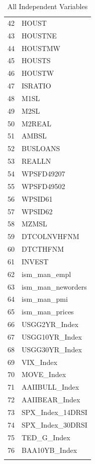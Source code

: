 \begin{longtable}{rl}
  42 & HOUST \\ 
  43 & HOUSTNE \\ 
  44 & HOUSTMW \\ 
  45 & HOUSTS \\ 
  46 & HOUSTW \\ 
  47 & ISRATIO \\ 
  48 & M1SL \\ 
  49 & M2SL \\ 
  50 & M2REAL \\ 
  51 & AMBSL \\ 
  52 & BUSLOANS \\ 
  53 & REALLN \\ 
  54 & WPSFD49207 \\ 
  55 & WPSFD49502 \\ 
  56 & WPSID61 \\ 
  57 & WPSID62 \\ 
  58 & MZMSL \\ 
  59 & DTCOLNVHFNM \\ 
  60 & DTCTHFNM \\ 
  61 & INVEST \\ 
  62 & ism\_man\_empl \\ 
  63 & ism\_man\_neworders \\ 
  64 & ism\_man\_pmi \\ 
  65 & ism\_man\_prices \\ 
  66 & USGG2YR\_Index \\ 
  67 & USGG10YR\_Index \\ 
  68 & USGG30YR\_Index \\ 
  69 & VIX\_Index \\ 
  70 & MOVE\_Index \\ 
  71 & AAIIBULL\_Index \\ 
  72 & AAIIBEAR\_Index \\ 
  73 & SPX\_Index\_14DRSI \\ 
  74 & SPX\_Index\_30DRSI \\ 
  75 & TED\_G\_Index \\ 
  76 & BAA10YB\_Index \\ 
   \hline
\hline
\caption{All Independent Variables} 
\end{longtable}

